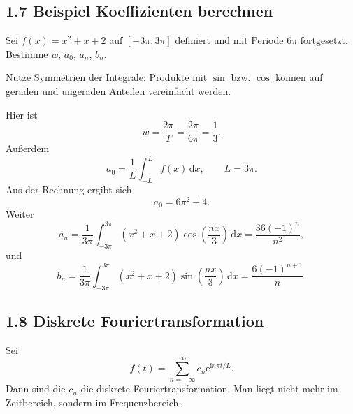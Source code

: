 \documentclass[11pt,a4paper]{article}
\newcommand{\ii}{\mathrm i}
\newcommand{\ee}{\mathrm e}
\newcommand{\dd}{\,\mathrm d}
\begin{document}
\begin{center}
\end{center}

\subsection{1.7 Beispiel Koeffizienten berechnen}
\begin{beispielbox}
Sei $f(x)=x^2+x+2$ auf $[-3\pi,3\pi]$ definiert und mit Periode $6\pi$ fortgesetzt. Bestimme $w$, $a_0$, $a_n$, $b_n$.
\end{beispielbox}
\begin{tippbox}
Nutze Symmetrien der Integrale: Produkte mit $\sin$ bzw. $\cos$ können auf geraden und ungeraden Anteilen vereinfacht werden.
\end{tippbox}
Hier ist
\[
w=\frac{2\pi}{T}=\frac{2\pi}{6\pi}=\frac13.
\]
Außerdem
\[
a_0=\frac1L\int_{-L}^{L}f(x)\dd x,
\qquad L=3\pi.
\]
Aus der Rechnung ergibt sich
\[
a_0=6\pi^2+4.
\]
Weiter
\[
a_n=\frac1{3\pi}\int_{-3\pi}^{3\pi}(x^2+x+2)\cos\left(\frac{nx}{3}\right)
\dd x
=\frac{36(-1)^n}{n^2},
\]
und
\[
b_n=\frac1{3\pi}\int_{-3\pi}^{3\pi}(x^2+x+2)\sin\left(\frac{nx}{3}\right)
\dd x
=\frac{6(-1)^{n+1}}{n}.
\]

\subsection{1.8 Diskrete Fouriertransformation}
Sei
\[
f(t)=\sum_{n=-\infty}^{\infty}c_n\ee^{\ii n\pi t/L}.
\]
Dann sind die $c_n$ die diskrete Fouriertransformation. Man liegt nicht mehr im Zeitbereich, sondern im Frequenzbereich.
\end{document}
